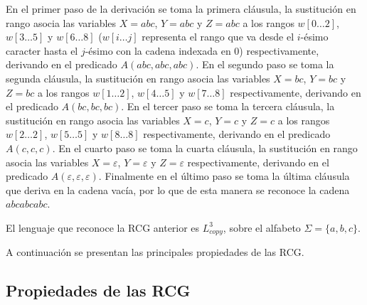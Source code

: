 En el primer paso de la derivación se toma la primera cláusula, la sustitución en rango asocia las variables $X=abc$, $Y=abc$ y $Z=abc$
a los rangos $w[0\dots 2]$, $w[3\dots 5]$ y $w[6\dots 8]$ ($w[i\dots j]$ representa el rango que va desde el $i$-ésimo caracter hasta el $j$-ésimo
con la cadena indexada en 0) respectivamente, derivando en el predicado $A(abc,abc,abc)$. En el segundo paso se
toma la segunda cláusula, la sustitución en rango asocia las variables $X=bc$, $Y=bc$ y $Z=bc$ a los rangos $w[1\dots 2]$, $w[4\dots 5]$ y $w[7\dots 8]$
respectivamente, derivando en el predicado $A(bc,bc,bc)$. En el tercer paso se toma la tercera cláusula,
la sustitución en rango asocia las variables $X=c$, $Y=c$ y $Z=c$ a los rangos $w[2\dots 2]$, $w[5\dots 5]$ y
$w[8\dots 8]$ respectivamente, derivando en el predicado $A(c,c,c)$.
En el cuarto paso se toma la cuarta cláusula, la sustitución en rango asocia las variables
$X=\varepsilon$, $Y=\varepsilon$ y $Z=\varepsilon$ respectivamente, derivando en el predicado
$A(\varepsilon,\varepsilon,\varepsilon)$. Finalmente en el  último paso se toma la última cláusula
que deriva en la cadena vacía, por lo que de esta manera se reconoce la cadena $abcabcabc$.

El lenguaje que reconoce la RCG anterior es $L_{copy}^3$, sobre el alfabeto $\Sigma=\{a,b,c\}$.

A continuación se presentan las principales propiedades de las RCG.
\subsection{Propiedades de las RCG}

